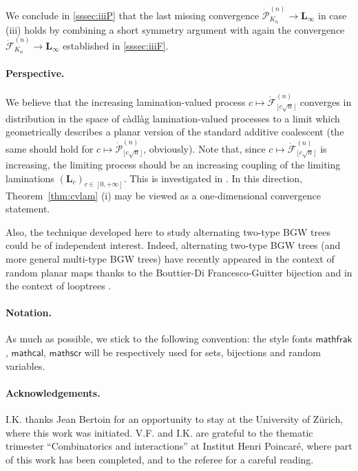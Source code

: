\documentclass[10pt]{amsart}
\theoremstyle{definition}\newtheorem{defi}[theo]{Definition}\newtheorem{rema}[theo]{Remark}\newtheorem{exam}[theo]{Example}\newtheorem{exem}[theo]{Example}\newtheorem{nota}[theo]{Notation}
\def\PPP{\mathcal P}
\def\FFF{\mathcal F}
\def\dFKn{\dot{\mathcal{F}}^{(n)}_{K_{n}}}
\def\dPKn{\dot{\mathcal{P}}^{(n)}_{K_{n}}}
\begin{document}
We conclude in \cref{sssec:iiiP} that   the last missing convergence $\dPKn \rightarrow \mathbf{L}_{\infty}$ in case (iii) holds by combining a short symmetry argument with again the convergence $ \dFKn \rightarrow \mathbf{L}_{\infty}$  established in \cref{sssec:iiiF}.


\paragraph*{Perspective.} We believe that the increasing lamination-valued process $ c \mapsto \dot{\FFF}^{(n)}_{\lfloor c\sqrt{n} \rfloor}$ converges in distribution in the space of c\`adl\`ag lamination-valued processes to a limit which geometrically describes a planar version of the standard additive coalescent \cite{AP98} (the same should hold for $ c \mapsto \dot{\PPP}^{(n)}_{\lfloor c\sqrt{n} \rfloor}$,
obviously).
Note that, since $ c \mapsto \dot{\FFF}^{(n)}_{\lfloor c\sqrt{n} \rfloor}$ is increasing,
the limiting process should be an increasing coupling of the limiting laminations $(\mathbf L_c)_{c \in [0,+\infty]}$.
This is investigated in \cite{Thev18}.
In this direction, Theorem~\ref{thm:cvlam} (i) may be viewed as a one-dimensional convergence statement.

Also, the technique developed here to study alternating two-type BGW trees could be of independent interest.
Indeed, alternating two-type BGW trees (and more general multi-type BGW trees) have recently appeared in the context of random planar maps thanks to the Bouttier-Di Francesco-Guitter bijection \cite{BDFG04,MM07,LGM09} and in the context of looptrees \cite{CK15}.

\paragraph*{Notation.} As much as possible, we stick to the following convention: the style fonts $\mathsf{mathfrak}$, $\mathsf{mathcal}$, $\mathsf{mathscr}$ will be respectively used for sets, bijections and random variables.

\paragraph*{Acknowledgements.} I.K. thanks Jean Bertoin for an opportunity to stay at the University of Z\"urich, where this work was initiated. V.F. and I.K. are grateful to the thematic trimester ``Combinatorics and interactions'' at Institut Henri Poincar\'e, where part of this work has been completed, and to the referee for a careful reading.
\end{document}

